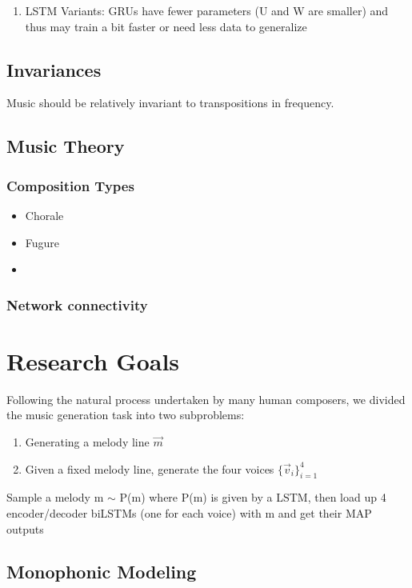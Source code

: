 \documentclass[a4paper,oneside,reqno,onecolumn]{amsart}
\begin{document}
\begin{enumerate}
    \item LSTM Variants: GRUs have fewer parameters (U and W are smaller) and
        thus may train a bit faster or need less data to generalize
\end{enumerate}

\subsection{Invariances}

Music should be relatively invariant to transpositions in frequency.

\subsection{Music Theory}

\subsubsection{Composition Types}

\begin{itemize}
    \item Chorale
    \item Fugure
    \item {}
\end{itemize}

\subsubsection{Network connectivity}

\section{Research Goals}

Following the natural process undertaken by many human composers, we divided
the music generation task into two subproblems:
\begin{enumerate}
    \item Generating a melody line $\vec{m}$
    \item Given a fixed melody line, generate the four voices $\{\vec{v}_i\}_{i=1}^4$
\end{enumerate}

Sample a melody m $\sim$ P(m) where P(m) is given by a LSTM, then load up 4
encoder/decoder biLSTMs (one for each voice) with m and get their MAP outputs

\subsection{Monophonic Modeling}
\end{document}
